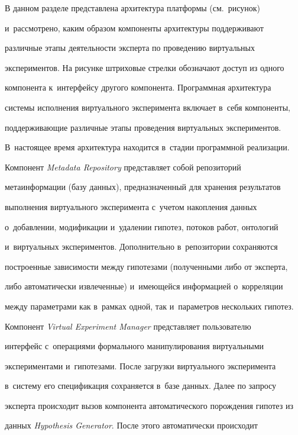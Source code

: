 В данном разделе представлена архитектура платформы (см.\ рисунок) 


и~рас\-смот\-ре\-но, каким образом компоненты архитектуры поддерживают 


различные этапы деятельности эксперта по проведению виртуальных 


экспериментов. На рисунке штриховые стрелки обозначают доступ из одного 


компонента к~интерфейсу другого компонента. Программная архитектура 


системы исполнения виртуального эксперимента включает в~себя компоненты, 


поддерживающие различные этапы проведения виртуальных экспериментов. 


В~настоящее время архитектура находится в~стадии программной реализации.





Компонент \textit{Metadata Repository} представляет собой репозиторий 


метаинформации (базу данных), предназначенный для хранения результатов 


выполнения виртуального эксперимента с~учетом накопления данных 


о~добавлении, модификации и~удалении гипотез, потоков работ, онтологий 


и~виртуальных экспериментов. Дополнительно в~репозитории сохраняются 


построенные зависимости между гипотезами (полученными либо от эксперта, 


либо автоматически извлеченные) и~имеющейся информацией о~корреляции 


между параметрами как в~рамках одной, так и~параметров нескольких гипотез.





Компонент \textit{Virtual Experiment Manager} представляет пользователю 


интерфейс с~операциями формального манипулирования виртуальными 


экспериментами и~гипотезами. После загрузки виртуального эксперимента 


в~систему его спецификация сохраняется в~базе данных. Далее по запросу 


эксперта происходит вызов компонента автоматического порождения гипотез из 


данных \textit{Hypothesis Generator}. После этого автоматически происходит 



